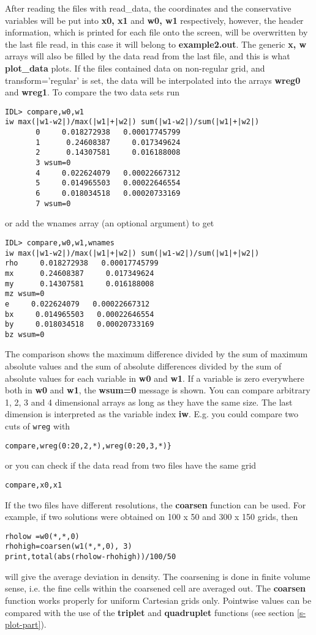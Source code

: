 \documentclass{article}
\begin{document}
After reading the files with read\_data, 
the coordinates and the conservative variables 
will be put into {\bf x0, x1} and {\bf w0, w1} respectively, however, 
the header information, which is printed for each file onto the screen, 
will be overwritten by the last file read, in this case it will belong to
{\bf example2.out}. The generic {\bf x, w} arrays will also be
filled by the data read from the last file, and this is what 
{\bf plot\_data} plots. If the files contained data on non-regular grid,
and transform='regular' is set, the data will be interpolated into 
the arrays {\bf wreg0} and {\bf wreg1}. 
To compare the two data sets run
\begin{verbatim}
IDL> compare,w0,w1
iw max(|w1-w2|)/max(|w1|+|w2|) sum(|w1-w2|)/sum(|w1|+|w2|)
       0     0.018272938   0.00017745799
       1      0.24608387     0.017349624
       2      0.14307581     0.016188008
       3 wsum=0
       4     0.022624079   0.00022667312
       5     0.014965503   0.00022646554
       6     0.018034518   0.00020733169
       7 wsum=0
\end{verbatim}
or add the wnames array (an optional argument) to get
\begin{verbatim}
IDL> compare,w0,w1,wnames
iw max(|w1-w2|)/max(|w1|+|w2|) sum(|w1-w2|)/sum(|w1|+|w2|)
rho     0.018272938   0.00017745799
mx      0.24608387     0.017349624
my      0.14307581     0.016188008
mz wsum=0
e     0.022624079   0.00022667312
bx     0.014965503   0.00022646554
by     0.018034518   0.00020733169
bz wsum=0
\end{verbatim}
The comparison shows the maximum difference divided by the sum of maximum 
absolute
values and the sum of absolute differences divided by the sum of absolute
values for each variable in {\bf w0} and {\bf w1}. If a variable is zero
everywhere both in {\bf w0} and {\bf w1}, the {\bf wsum=0} message is shown.
You can compare arbitrary 1, 2, 3 and 4 dimensional arrays as long as they 
have the same size.
The last dimension is interpreted as the variable index {\bf iw}.
E.g. you could compare two cuts of {\tt wreg} with
\begin{verbatim}
compare,wreg(0:20,2,*),wreg(0:20,3,*)}
\end{verbatim}
   or you can check if the data read from two files have the same grid
\begin{verbatim}
compare,x0,x1
\end{verbatim}
If the two files have different resolutions, the {\bf coarsen} 
function can be used. For example, if two solutions were obtained on 
100 x 50 and 300 x 150 grids, then 
\begin{verbatim}
rholow =w0(*,*,0)
rhohigh=coarsen(w1(*,*,0), 3)
print,total(abs(rholow-rhohigh))/100/50
\end{verbatim}
will give the average deviation in density. The coarsening is done in
finite volume sense, i.e. the fine cells within the coarsened cell are
averaged out. The {\bf coarsen} function works properly for
uniform Cartesian grids only. Pointwise values can be compared
with the use of the {\bf triplet} and {\bf quadruplet} functions 
(see section \ref{s-plot-part}).
\end{document}
